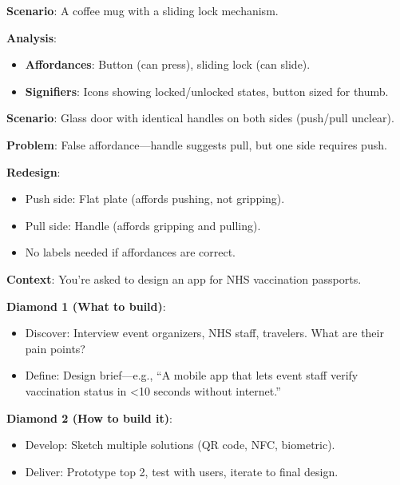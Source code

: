 \begin{exbox}
\textbf{Scenario}: A coffee mug with a sliding lock mechanism.

\textbf{Analysis}:
\begin{itemize}
  \item \textbf{Affordances}: Button (can press), sliding lock (can slide).
  \item \textbf{Signifiers}: Icons showing locked/unlocked states, button sized for thumb.
\end{itemize}
\end{exbox}

\begin{exbox}
\textbf{Scenario}: Glass door with identical handles on both sides (push/pull unclear).

\textbf{Problem}: False affordance---handle suggests pull, but one side requires push.

\textbf{Redesign}:
\begin{itemize}
  \item Push side: Flat plate (affords pushing, not gripping).
  \item Pull side: Handle (affords gripping and pulling).
  \item No labels needed if affordances are correct.
\end{itemize}
\end{exbox}

\begin{exbox}
\textbf{Context}: You're asked to design an app for NHS vaccination passports.

\textbf{Diamond 1 (What to build)}:
\begin{itemize}
  \item Discover: Interview event organizers, NHS staff, travelers. What are their pain points?
  \item Define: Design brief---e.g., ``A mobile app that lets event staff verify vaccination status in <10 seconds without internet.''
\end{itemize}

\textbf{Diamond 2 (How to build it)}:
\begin{itemize}
  \item Develop: Sketch multiple solutions (QR code, NFC, biometric).
  \item Deliver: Prototype top 2, test with users, iterate to final design.
\end{itemize}
\end{exbox}

